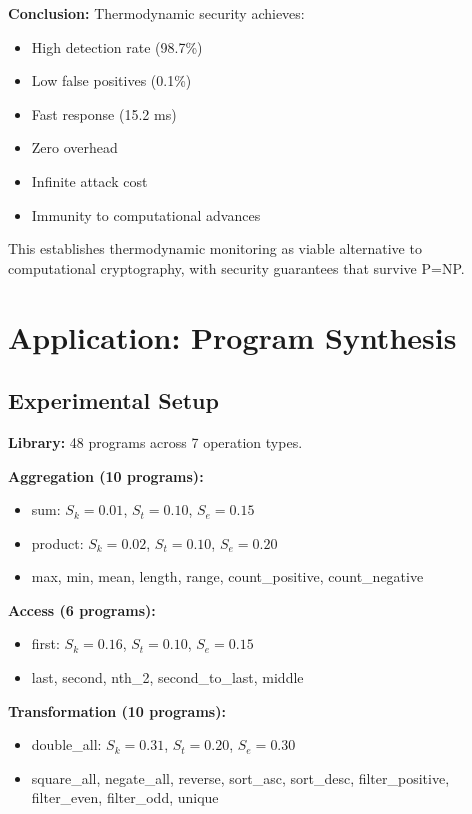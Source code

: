 \documentclass[twocolumn,10pt]{article}
\theoremstyle{definition}
\theoremstyle{remark}
\newcommand{\Sk}{S_k}
\newcommand{\St}{S_t}
\newcommand{\Se}{S_e}
\begin{document}
\textbf{Conclusion:} Thermodynamic security achieves:
\begin{itemize}
\item High detection rate (98.7\%)
\item Low false positives (0.1\%)
\item Fast response (15.2 ms)
\item Zero overhead
\item Infinite attack cost
\item Immunity to computational advances
\end{itemize}

This establishes thermodynamic monitoring as viable alternative to computational cryptography, with security guarantees that survive P=NP.

\section{Application: Program Synthesis}
\label{sec:synthesis}

\subsection{Experimental Setup}

\textbf{Library:} 48 programs across 7 operation types.

\textbf{Aggregation (10 programs):}
\begin{itemize}
\item sum: $\Sk=0.01$, $\St=0.10$, $\Se=0.15$
\item product: $\Sk=0.02$, $\St=0.10$, $\Se=0.20$
\item max, min, mean, length, range, count\_positive, count\_negative
\end{itemize}

\textbf{Access (6 programs):}
\begin{itemize}
\item first: $\Sk=0.16$, $\St=0.10$, $\Se=0.15$
\item last, second, nth\_2, second\_to\_last, middle
\end{itemize}

\textbf{Transformation (10 programs):}
\begin{itemize}
\item double\_all: $\Sk=0.31$, $\St=0.20$, $\Se=0.30$
\item square\_all, negate\_all, reverse, sort\_asc, sort\_desc, filter\_positive, filter\_even, filter\_odd, unique
\end{itemize}
\end{document}
